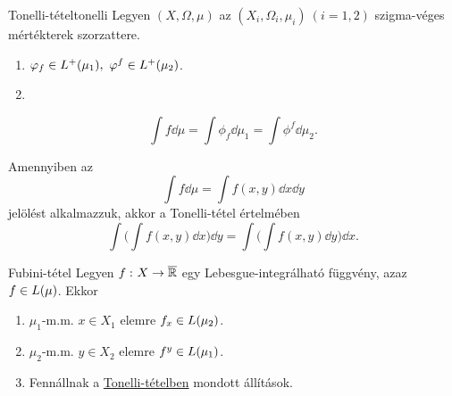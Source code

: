 \documentclass[
]{elteikthesis}[2024/04/26]
\begin{document}
	\begin{theorem}{Tonelli-tétel}{tonelli}
		Legyen \( (X, \Omega, \mu) \)
		az \( (X_i, \Omega_i, \mu_i) \ (i=1,2) \) szigma-véges mértékterek szorzattere.
		\begin{enumerate}[label=\alph*)]
			\item \( \varphi_f \in \StepFuncPlus(\mu_1), \ \varphi^f \in \StepFuncPlus(\mu_2) \).
			\item
		\end{enumerate}
		\[
			\int f \dd{\mu} = 
			\int \phi_f \dd{\mu_1} =
			\int \phi^f \dd{\mu_2}.
		\]
	\end{theorem}
	
	Amennyiben az 
	\[
		\int f \dd{\mu} = 
		\int f(x, y) \dd{x} \dd{y}
	\]
	jelölést alkalmazzuk, akkor a Tonelli-tétel értelmében
	\[
		\int \biggl( \int f(x, y) \dd{x} \biggr) \dd{y} =
		\int \biggl( \int f(x, y) \dd{y} \biggr) \dd{x}.
	\]
	
	\begin{theorem}{Fubini-tétel}{}
		Legyen \( f \,\colon X \to \overline{\mathbb{R}} \) egy Lebesgue-integrálható függvény, 
		azaz \( f \in \Lebesgue(\mu) \). Ekkor
		\begin{enumerate}[label*=\alph*)]
			\item \( \mu_1 \)-m.m. \( x \in X_1 \) elemre \( f_x \in \Lebesgue(\mu_2) \).
			\item \( \mu_2 \)-m.m. \( y \in X_2 \) elemre \( f^y \in \Lebesgue(\mu_1) \).
			\item Fennállnak a \hyperref[th:tonelli]{Tonelli-tételben} mondott állítások.
		\end{enumerate}
	\end{theorem}
	
\end{document}
